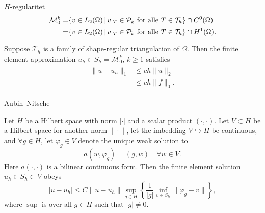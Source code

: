 \fi
\begin{frame}{$H$-regularitet}
\begin{align*}
    \mathcal{M}^k_0 =& \{ v \in L_2(\Omega) \,|\, v|_T \in \mathcal{P}_k \text{ for alle } T \in \mathcal{T}_h \} \cap C^0(\Omega) \\
    =& \{ v \in L_2(\Omega) \,|\, v|_T \in \mathcal{P}_k \text{ for alle } T \in \mathcal{T}_h \} \cap H^1(\Omega) .
\end{align*}
    \begin{theorem}
    Suppose $\mathcal{T}_h$ is a family of shape-regular triangulation of $\Omega$. 
    Then the finite element approximation $u_h\in S_h = \mathcal{M}^k_0$, $k\geq 1$ satisfies
    \begin{align}
        \begin{split}
            \|u-u_h\|_1&\leq ch\|u\|_2\ \\
            &\leq ch\|f\|_0.
        \end{split}
        \label{eq:7.3}
    \end{align}\label{thm:7.3}
    \end{theorem}
\end{frame}

\begin{frame}{Aubin–Nitsche}
    \begin{theorem}
    Let $H$ be a Hilbert space with norm $|\cdot|$ and a scalar product $(\cdot,\cdot)$.
    Let $V\subset H$ be a Hilbert space for another norm $\|\cdot\|$, let the imbedding
    $V \hookrightarrow H$ be continuous,
    and $\forall g \in H$, let $\varphi_g \in V$ denote the unique weak solution to 
    \begin{equation}
        a(w,\varphi_g) = (g,w) \quad \forall w\in V. \label{eq:aubin_nitsche_antagelse}
    \end{equation}
    Here $a(\cdot,\cdot)$ is a bilinear continuous form.
    Then the finite element solution $u_h\in S_h \subset V$ obeys
    \begin{equation*}
        |u-u_h| \leq C \|u-u_h\| \sup_{g\in H} \left \{ \frac{1}{|g|} \inf_{v \in S_h} \|\varphi_g - v\| \right \},
    \end{equation*}
    where $\sup$ is over all $g\in H$ such that $|g|\neq 0$.
    \end{theorem}
\end{frame}

